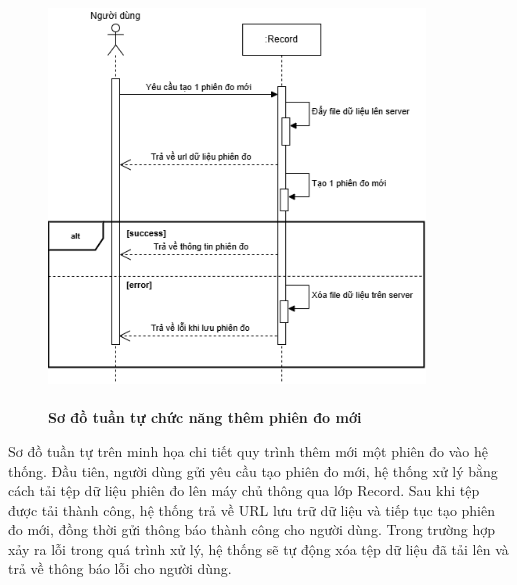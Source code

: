 \begin{figure}[H]
	\centering
	\includegraphics[width=10cm,height=11cm]{Images/sequence/record/create.drawio.png}
	\caption[Sơ đồ tuần tự chức năng thêm phiên đo mới]{\bfseries \fontsize{12pt}{0pt}
		\selectfont Sơ đồ tuần tự chức năng thêm phiên đo mới}
	\label{sequence_create_record} %
\end{figure}
Sơ đồ tuần tự trên minh họa chi tiết quy trình thêm mới một phiên đo vào hệ thống. Đầu tiên, người dùng gửi yêu cầu tạo phiên đo mới, hệ thống xử lý bằng cách tải tệp dữ liệu phiên đo lên máy chủ thông qua lớp Record.
Sau khi tệp được tải thành công, hệ thống trả về URL lưu trữ dữ liệu và tiếp tục tạo phiên đo mới, đồng thời gửi thông báo thành công cho người dùng. Trong trường hợp xảy ra lỗi trong quá trình xử lý,
hệ thống sẽ tự động xóa tệp dữ liệu đã tải lên và trả về thông báo lỗi cho người dùng.

